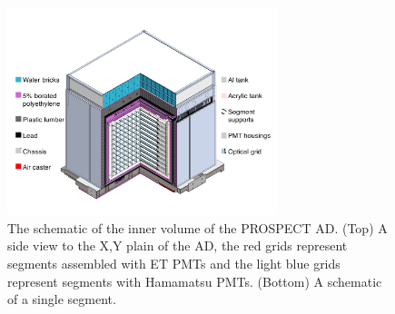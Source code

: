 \begin{figure}
    \centering
    \includegraphics[width=0.7\textwidth]{Figures/DetectorDesign.pdf}
    \caption[The inner volume of the PROSPECT AD]{The schematic of the inner volume of the PROSPECT AD.
    (Top) A side view to the X,Y plain of the AD, the red grids represent segments assembled with ET PMTs and the light blue grids represent segments with Hamamatsu PMTs.
    (Bottom) A schematic of a single segment.
    }
    \label{fig:PROSPECT_AD}
\end{figure}
    
\label{sec:detection}

\label{sec:OG}





